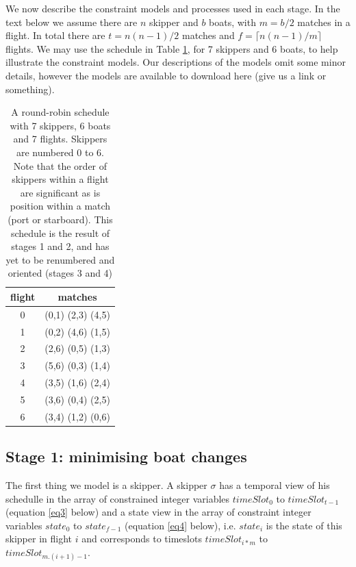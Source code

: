 \documentclass{llncs}
\begin{document}
We now describe the constraint models and processes used in each stage. In the text below we assume there are $n$ skipper and $b$ boats, with $m = b/2$ matches in a flight. In total there are $t = n(n-1)/2$ matches and $f = \lceil n(n-1)/m  \rceil$ flights. We may use the schedule in Table \ref{tab1}, for 7 skippers and 6 boats, to help illustrate the constraint models. Our descriptions of the models omit some minor details, however the models are available to download here (give us a link or something).

\begin{table}[h]
\begin{center}
\begin{tabular}{cc} \\ 
flight & matches \\ \hline
0 & (0,1) (2,3) (4,5)  \\
1 & (0,2) (4,6) (1,5)  \\
2 & (2,6) (0,5) (1,3)  \\
3 & (5,6) (0,3) (1,4)  \\
4 & (3,5) (1,6) (2,4)  \\
5 & (3,6) (0,4) (2,5)  \\
6 & (3,4) (1,2) (0,6)  \\ \hline
\end{tabular}
\end{center}
\caption{A round-robin schedule with 7 skippers, 6 boats and 7 flights. Skippers are numbered 0 to 6. Note that the order of skippers within a flight are significant as is position within a match (port or starboard). This schedule is the result of stages 1 and 2, and has yet to be renumbered and oriented (stages 3 and 4)}
\label{tab1}
\end{table}

\subsection{Stage 1: minimising boat changes}
The first thing we model is a skipper. A skipper $\sigma$ has a temporal view of his schedulle in the array of constrained integer variables $timeSlot_{0}$ to $timeSlot_{t-1}$ (equation \ref{eq3} below) and a state view in the array of constraint integer variables $state_{0}$ to $state_{f-1}$ (equation \ref{eq4} below), i.e. $state_{i}$ is the state of this skipper in flight $i$ and corresponds to timeslots $timeSlot_{i*m}$ to $timeSlot_{m.(i+1)-1}$.
\end{document}
